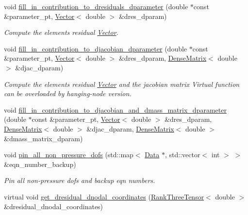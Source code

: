 \begin{DoxyCompactItemize}
void \hyperlink{classoomph_1_1GeneralisedNewtonianNavierStokesEquations_a315b6dd9916836000c858a434d198851}{fill\+\_\+in\+\_\+contribution\+\_\+to\+\_\+dresiduals\+\_\+dparameter} (double $\ast$const \&parameter\+\_\+pt, \hyperlink{classoomph_1_1Vector}{Vector}$<$ double $>$ \&dres\+\_\+dparam)
\begin{DoxyCompactList}\small\item\em Compute the element\textquotesingle{}s residual \hyperlink{classoomph_1_1Vector}{Vector}. \end{DoxyCompactList}\item 
void \hyperlink{classoomph_1_1GeneralisedNewtonianNavierStokesEquations_a8b9b51442b6209405de77a0edca19c9b}{fill\+\_\+in\+\_\+contribution\+\_\+to\+\_\+djacobian\+\_\+dparameter} (double $\ast$const \&parameter\+\_\+pt, \hyperlink{classoomph_1_1Vector}{Vector}$<$ double $>$ \&dres\+\_\+dparam, \hyperlink{classoomph_1_1DenseMatrix}{Dense\+Matrix}$<$ double $>$ \&djac\+\_\+dparam)
\begin{DoxyCompactList}\small\item\em Compute the element\textquotesingle{}s residual \hyperlink{classoomph_1_1Vector}{Vector} and the jacobian matrix Virtual function can be overloaded by hanging-\/node version. \end{DoxyCompactList}\item 
void \hyperlink{classoomph_1_1GeneralisedNewtonianNavierStokesEquations_a9db1ab85593b9eb02744bad781f64204}{fill\+\_\+in\+\_\+contribution\+\_\+to\+\_\+djacobian\+\_\+and\+\_\+dmass\+\_\+matrix\+\_\+dparameter} (double $\ast$const \&parameter\+\_\+pt, \hyperlink{classoomph_1_1Vector}{Vector}$<$ double $>$ \&dres\+\_\+dparam, \hyperlink{classoomph_1_1DenseMatrix}{Dense\+Matrix}$<$ double $>$ \&djac\+\_\+dparam, \hyperlink{classoomph_1_1DenseMatrix}{Dense\+Matrix}$<$ double $>$ \&dmass\+\_\+matrix\+\_\+dparam)
\item 
void \hyperlink{classoomph_1_1GeneralisedNewtonianNavierStokesEquations_a5b85b22f90a38b141620ec1720070311}{pin\+\_\+all\+\_\+non\+\_\+pressure\+\_\+dofs} (std\+::map$<$ \hyperlink{classoomph_1_1Data}{Data} $\ast$, std\+::vector$<$ int $>$ $>$ \&eqn\+\_\+number\+\_\+backup)
\begin{DoxyCompactList}\small\item\em Pin all non-\/pressure dofs and backup eqn numbers. \end{DoxyCompactList}\item 
virtual void \hyperlink{classoomph_1_1GeneralisedNewtonianNavierStokesEquations_a2c26367aca1f2c400f69d63786474eb8}{get\+\_\+dresidual\+\_\+dnodal\+\_\+coordinates} (\hyperlink{classoomph_1_1RankThreeTensor}{Rank\+Three\+Tensor}$<$ double $>$ \&dresidual\+\_\+dnodal\+\_\+coordinates)

\end{DoxyCompactItemize}
